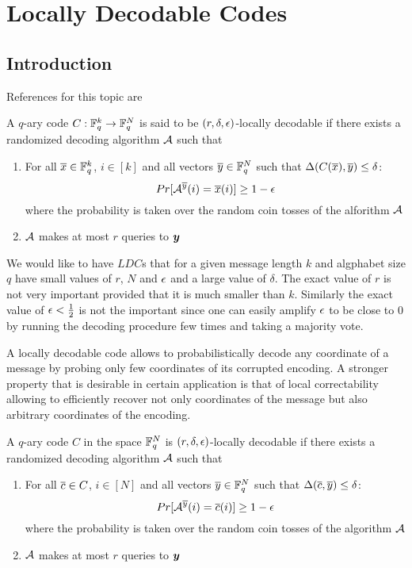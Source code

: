 \chapter{Locally Decodable Codes}
\section{Introduction}
References for this topic are \cite{ldcsergeysurvey}
\begin{definition}
	A $q$-ary code $C:\mathbb{F}^k_q\to \mathbb{F}_q^N$ is said to be $(r,\delta, \epsilon)$-locally decodable if there exists a randomized decoding algorithm $\mathcal{A}$ such that \begin{enumerate}
		\item For all $\overline{x}\in \mathbb{F}_q^k$, $i\in [k]$ and all vectors $\overline{y}\in \mathbb{F}_q^N$ such that $\Delta(C(\overline{x}),\overline{y})\leq \delta$: $$Pr[\mathcal{A}^{\overline{y}}(i)=\overline{x}(i)]\geq 1-\epsilon$$where the probability is taken over the random coin tosses of the alforithm $\mathcal{A}$
		\item $\mathcal{A}$ makes at most $r$ queries to $\boldsymbol{y}$
	\end{enumerate}
\end{definition}

We would like to have $LDC$s that for a given message length $k$ and algphabet size $q$ have small values of $r$, $N$ and $\epsilon$ and a large value of $\delta$. The exact value of $r$ is not very important provided that it is much smaller than $k$. Similarly the exact value of $\epsilon<\frac12$ is not the important since one can easily amplify $\epsilon$ to be close to 0 by running the decoding procedure few times and taking a majority vote. 

A locally decodable code allows to probabilistically decode any coordinate of a message by probing only few coordinates of its corrupted encoding. A stronger property that is desirable in certain application is that of local correctability allowing to efficiently recover not only coordinates of the message but also arbitrary coordinates of the encoding. 

\begin{definition}
	A $q$-ary code $C$ in the space $ \mathbb{F}_q^N$ is  $(r,\delta, \epsilon)$-locally decodable if there exists a randomized decoding algorithm $\mathcal{A}$ such that \begin{enumerate}
	\item For all $\overline{c}\in C$, $i\in [N]$ and all vectors $\overline{y}\in \mathbb{F}_q^N$ such that $\Delta(\overline{c},\overline{y})\leq \delta$: $$Pr[\mathcal{A}^{\overline{y}}(i)=\overline{c}(i)]\geq 1-\epsilon$$where the probability is taken over the random coin tosses of the algorithm $\mathcal{A}$
	\item $\mathcal{A}$ makes at most $r$ queries to $\boldsymbol{y}$
\end{enumerate}
\end{definition}

